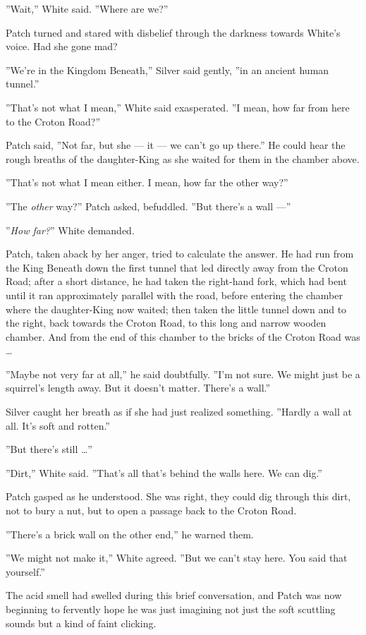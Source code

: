 \documentclass[12pt]{book}
\begin{document}
''Wait,'' White said. ''Where are we?''

Patch turned and stared with disbelief through the darkness towards
White's voice. Had she gone mad?

''We're in the Kingdom Beneath,'' Silver said gently, ''in an ancient
human tunnel.''

''That's not what I mean,'' White said exasperated. ''I mean, how far
from here to the Croton Road?''

Patch said, ''Not far, but she --- it --- we can't go up there.'' He
could hear the rough breaths of the daughter-King as she waited for
them in the chamber above.

''That's not what I mean either. I mean, how far the other way?''

''The \textit{other} way?'' Patch asked, befuddled. ''But there's a
wall ---''

''\textit{How far?}'' White demanded.

Patch, taken aback by her anger, tried to calculate the answer. He had
run from the King Beneath down the first tunnel that led directly away
from the Croton Road; after a short distance, he had taken the
right-hand fork, which had bent until it ran approximately parallel
with the road, before entering the chamber where the daughter-King now
waited; then taken the little tunnel down and to the right, back
towards the Croton Road, to this long and narrow wooden chamber. And
from the end of this chamber to the bricks of the Croton Road was
\ldots{}

''Maybe not very far at all,'' he said doubtfully. ''I'm not sure. We
might just be a squirrel's length away. But it doesn't matter. There's
a wall.''

Silver caught her breath as if she had just realized
something. ''Hardly a wall at all. It's soft and rotten.''

''But there's still \ldots{}''

''Dirt,'' White said. ''That's all that's behind the walls here. We
can dig.''

Patch gasped as he understood. She was right, they could dig through
this dirt, not to bury a nut, but to open a passage back to the Croton
Road.

''There's a brick wall on the other end,'' he warned them.

''We might not make it,'' White agreed. ''But we can't stay here. You
said that yourself.''

The acid smell had swelled during this brief conversation, and Patch
was now beginning to fervently hope he was just imagining not just the
soft scuttling sounds but a kind of faint clicking.
\end{document}
